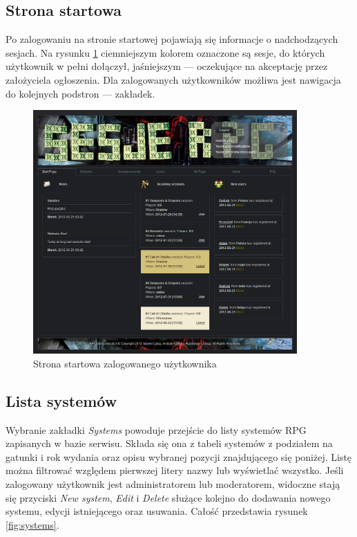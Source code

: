 \subsection{Strona startowa}
\label{sec:start_page}

Po zalogowaniu na stronie startowej pojawiają się informacje o nadchodzących sesjach. Na rysunku \ref{fig:start_page_joined} ciemniejszym kolorem oznaczone są sesje, do których użytkownik w pełni dołączył, jaśniejszym --- oczekujące na akceptację przez założyciela ogłoszenia. Dla zalogowanych użytkowników możliwa jest nawigacja do kolejnych podstron --- zakładek.
\begin{figure}[htb]	
\centering
\includegraphics[width=0.9\textwidth]{./img/interfejsy/start_page_joined}
\caption{Strona startowa zalogowanego użytkownika}
\label{fig:start_page_joined}
\end{figure}

\subsection{Lista systemów}
\label{sec:systems}
Wybranie zakładki \emph{Systems} powoduje przejście do listy systemów RPG zapisanych w bazie serwisu. Składa się ona z tabeli systemów z podziałem na gatunki i rok wydania oraz opisu wybranej pozycji znajdującego się poniżej. Listę można filtrować względem pierwszej litery nazwy lub wyświetlać wszystko. Jeśli zalogowany użytkownik jest administratorem lub moderatorem, widoczne stają się przyciski \emph{New system}, \emph{Edit} i \emph{Delete} służące kolejno do dodawania nowego systemu, edycji istniejącego oraz usuwania. Całość przedstawia rysunek \ref{fig:systems}.

